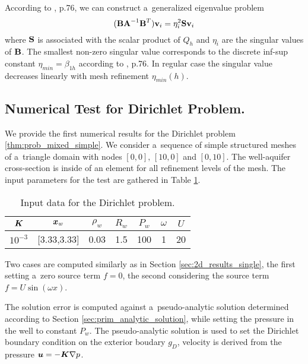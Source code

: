 According to \cite{brezzi_mixed_1991}, p.76, we can construct a~generalized eigenvalue problem
\begin{equation}
    (\textbf{\textrm{B}}\textbf{\textrm{A}}^{-1}\textbf{\textrm{B}}^T) \textbf{\textrm{v}}_i = \eta^2_i \textbf{\textrm{S}} \textbf{\textrm{v}}_i
\end{equation}
where $\textbf{\textrm{S}}$ is associated with the scalar product of $Q_h$ and $\eta_i$ are the singular values of $\textbf{\textrm{B}}$.
The smallest non-zero singular value corresponds to the discrete inf-sup constant $\eta_{min} = \beta_{1h}$
according to \cite{brezzi_mixed_1991}, p.76.
In regular case the singular value decreases linearly with mesh refinement $\eta_{min}(h)$.


\subsection{Numerical Test for Dirichlet Problem.}
We provide the first numerical results for the Dirichlet problem \ref{thm:prob_mixed_simple}.
We consider a~sequence of simple structured meshes of a~triangle domain with nodes $[0,0],\,[10,0]$ and $[0,10]$.
The well-aquifer cross-section is inside of an element for all refinement levels of the mesh.
The input parameters for the test are gathered in Table \ref{tab:test_case_10_data}.
%
\begin{table}[!hb]
\begin{center}
\begin{tabular}{ccccccc}
\toprule
$\mathbf{\boldsymbol{K}}$ & $\mathbf{\boldsymbol{x}}_w$  & $\rho_w$ & $R_w$ & $P_w$ & $\omega$ & $U$ \\
\midrule
$10^{-3}$ & {}[3.33,3.33] & 0.03 & 1.5 & 100 & 1 & 20\\
\bottomrule
\end{tabular}
\caption{Input data for the Dirichlet problem.}
\label{tab:test_case_10_data}
\end{center}
\end{table}
%
Two cases are computed similarly as in Section \ref{sec:2d_results_single},
the first setting a~zero source term $f=0$,
the second considering the source term $f=U\sin(\omega x)$.

The solution error is computed against a~pseudo-analytic solution determined according to Section \ref{sec:prim_analytic_solution},
while setting the pressure in the well to constant $P_w$. The pseudo-analytic solution is used to set the Dirichlet boundary condition
on the exterior boudary $g_D$, velocity is derived from the pressure $\mathbf{\boldsymbol{u}}= -\mathbf{\boldsymbol{K}} \nabla p$.

